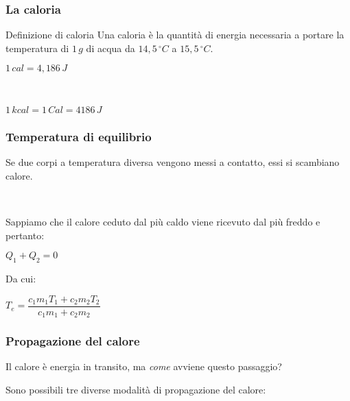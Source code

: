 \documentclass[]{beamer}
\theoremstyle{plain}
\begin{document}
\begin{frame}
\frametitle{La caloria}
\begin{block}{Definizione di caloria}
Una caloria è la quantità di energia necessaria a portare la temperatura di $ 1 \, g $ di acqua da $ 14,5 \, ^\circ C $ a $ 15,5 \, ^\circ C$.
\begin{center}
\colorbox{marroncino!30}{$ 1 \, cal = 4, 186 \, J $}\pause

~

$ 1 \, kcal = 1 \, Cal = 4186 \, J $
\end{center}
\end{block}
\end{frame}



\begin{frame}
\frametitle{Temperatura di equilibrio}
Se due corpi a temperatura diversa vengono messi a contatto, essi si scambiano calore.\pause

~

Sappiamo che \alert<2>{il calore ceduto dal più caldo viene ricevuto dal più freddo} e pertanto:
\begin{center}
$ Q_1 + Q_2 = 0 $\pause
\end{center}
Da cui:
\begin{center}
\colorbox{marroncino!30}{$ T_e = \dfrac{c_1 m_1 T_1 + c_2 m_2 T_2}{c_1 m_1 + c_2 m_2} $}
\end{center}
\end{frame}





\begin{frame}
\frametitle{Propagazione del calore}
Il calore è energia in transito, ma \emph{come} avviene questo passaggio?\pause

Sono possibili tre diverse \alert{modalità di propagazione del calore}:
  \begin{columns}
    \begin{column}{0.33\textwidth}
    \end{column}
    \begin{column}{0.33\textwidth}
    \end{column}
    \begin{column}{0.33\textwidth}
    \end{column}
  \end{columns}
\end{frame}
\end{document}
